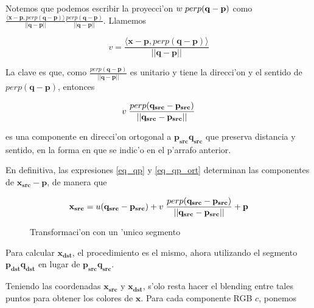 Notemos que podemos escribir la proyecci'on $w\hspace{0.1cm}perp(\mathbf{q} - \mathbf{p})$ como $\frac{\langle \mathbf{x} - \mathbf{p}, perp(\mathbf{q} - \mathbf{p}) \rangle}{||\mathbf{q} - \mathbf{p}||} \frac{perp(\mathbf{q} - \mathbf{p})}{||\mathbf{q} - \mathbf{p}||}$. Llamemos

\begin{equation}
v = \frac{\langle \mathbf{x} - \mathbf{p}, perp(\mathbf{q} - \mathbf{p}) \rangle}{||\mathbf{q} - \mathbf{p}||}
\label{eq_v_posta}
\end{equation}

\noindent
La clave es que, como $\frac{perp(\mathbf{q} - \mathbf{p})}{||\mathbf{q} - \mathbf{p}||}$ es unitario y tiene la direcci'on y el sentido de $perp(\mathbf{q} - \mathbf{p})$, entonces 

\begin{equation}
v \hspace{0.10cm} \frac{perp(\mathbf{q_{src}} - \mathbf{p_{src}})}{||\mathbf{q_{src}} - \mathbf{p_{src}}||}
\label{eq_qp_ort}
\end{equation}

\noindent
es una componente en direcci'on ortogonal a $\mathbf{p_{src}q_{src}}$ que preserva distancia y sentido, en la forma en que se indic'o en el p'arrafo anterior.

En definitiva, las expresiones \ref{eq_qp} y \ref{eq_qp_ort} determinan las componentes de $\mathbf{x_{src}} - \mathbf{p}$, de manera que

\begin{equation}
\mathbf{x_{src}} = u (\mathbf{q_{src}} - \mathbf{p_{src}}) + v \hspace{0.10cm} \frac{perp(\mathbf{q_{src}} - \mathbf{p_{src}})}{||\mathbf{q_{src}} - \mathbf{p_{src}}||} + \mathbf{p}
\label{eq_x_posta}
\end{equation}

\begin{figure}[H]
	\begin{center}
		
	\end{center}		
	\caption{Transformaci'on con un 'unico segmento}
	\label{fig7}
\end{figure}

\noindent
Para calcular $\mathbf{x_{dst}}$, el procedimiento es el mismo, ahora utilizando el segmento $\mathbf{p_{dst}q_{dst}}$ en lugar de $\mathbf{p_{src}q_{src}}$.

Teniendo las coordenadas $\mathbf{x_{src}}$ y $\mathbf{x_{dst}}$, s'olo resta hacer el blending entre tales puntos para obtener los colores de $\mathbf{x}$. Para cada componente RGB $c$, ponemos

